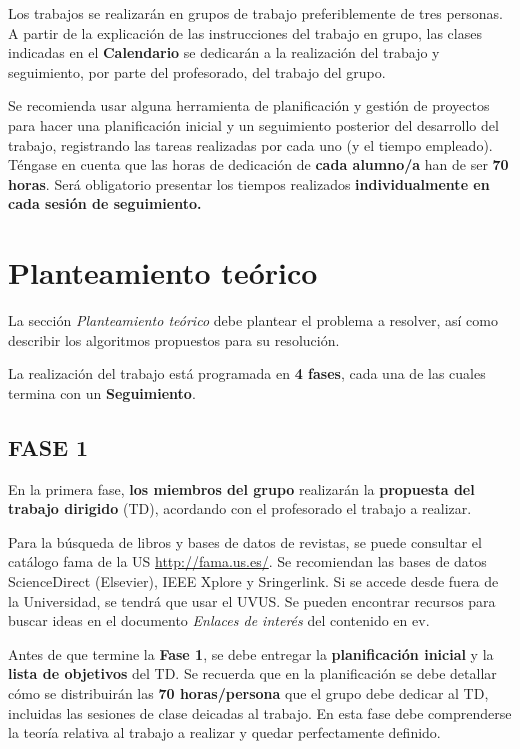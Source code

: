 \documentclass[a4paper]{article}
\begin{document}
Los trabajos se realizarán en grupos de trabajo preferiblemente de tres personas.  A partir de la explicación de las instrucciones del trabajo en grupo, las clases indicadas en el {\bf Calendario} se dedicarán a la realización del trabajo y seguimiento, por parte del profesorado, del trabajo del grupo. 

Se recomienda usar alguna herramienta de planificación y gestión de proyectos para hacer una planificación inicial y un seguimiento posterior del desarrollo del trabajo, registrando las tareas realizadas por cada uno (y el tiempo empleado). Téngase en cuenta que las horas de dedicación de \textbf{cada alumno/a} han de ser \textbf{70 horas}. Será obligatorio presentar los tiempos realizados {\bf individualmente en cada sesión de seguimiento.}

\section{Planteamiento teórico}

La sección \textit{Planteamiento teórico} debe plantear el problema a resolver, así como describir los algoritmos propuestos para su resolución. 

La realización del trabajo está programada en {\bf 4 fases}, cada una de las cuales termina con un {\bf Seguimiento}.
\subsection*{FASE 1}
En la primera fase, \textbf{los miembros del grupo} realizarán la \textbf{propuesta del trabajo dirigido} (TD), acordando con el profesorado el trabajo a realizar. 

Para la búsqueda de libros y bases de datos de revistas, se puede consultar el catálogo fama de la US \url{http://fama.us.es/}. Se recomiendan las bases de datos ScienceDirect (Elsevier), IEEE Xplore y Sringerlink. Si se accede desde fuera de la Universidad, se tendrá que usar el UVUS. Se pueden encontrar recursos para buscar ideas en el documento \textit{Enlaces de interés} del contenido en ev.

Antes de que termine la \textbf{Fase 1}, se debe entregar la {\bf planificación inicial} y la {\bf lista de objetivos} del TD. Se recuerda que en la planificación se debe detallar cómo se distribuirán las {\bf 70 horas/persona} que el grupo debe dedicar al TD, incluidas las sesiones de clase deicadas al trabajo.  
En esta fase debe comprenderse la teoría relativa al trabajo a realizar y quedar perfectamente definido. 
\end{document}
